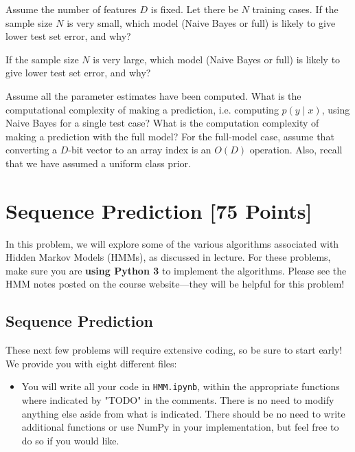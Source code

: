 \documentclass{article}
\begin{document}
\problem[2] Assume the number of features $D$ is fixed. Let there be $N$ training cases. If the sample size $N$ is very small, which model (Naive Bayes or full) is likely to give lower test set error, and why?
\begin{subsolution}
	
\end{subsolution}
\newpage

\problem[2] If the sample size $N$ is very large, which model (Naive Bayes or full) is likely to give lower test set error, and why?
\begin{subsolution}
	
\end{subsolution}
\newpage

\problem[11] Assume all the parameter estimates have been computed. What is the computational complexity of making a prediction, i.e. computing $p(y \mid x)$, using Naive Bayes for a single test case? What is the computation complexity of making a prediction with the full model? For the full-model case, assume that converting a $D$-bit vector to an array index is an $O(D)$ operation.  Also, recall that we have assumed a uniform class prior. 
\begin{subsolution}
	
\end{subsolution}
\newpage


\newpage
\section{Sequence Prediction [75 Points]}

In this problem, we will explore some of the various algorithms associated with Hidden Markov Models (HMMs), as discussed in lecture.  For these problems, make sure you are \textbf{using Python 3} to implement the algorithms. Please see the HMM notes posted on the course website---they will be helpful for this problem!

\subsection{Sequence Prediction}

These next few problems will require extensive coding, so be sure to start early! We provide you with eight different files:
\begin{itemize}
  \item You will write all your code in \texttt{HMM.ipynb}, within the appropriate functions where indicated by "TODO" in the comments. There is no need to modify anything else aside from what is indicated. There should be no need to write additional functions or use NumPy in your implementation, but feel free to do so if you would like.
\end{itemize}
\end{document}
